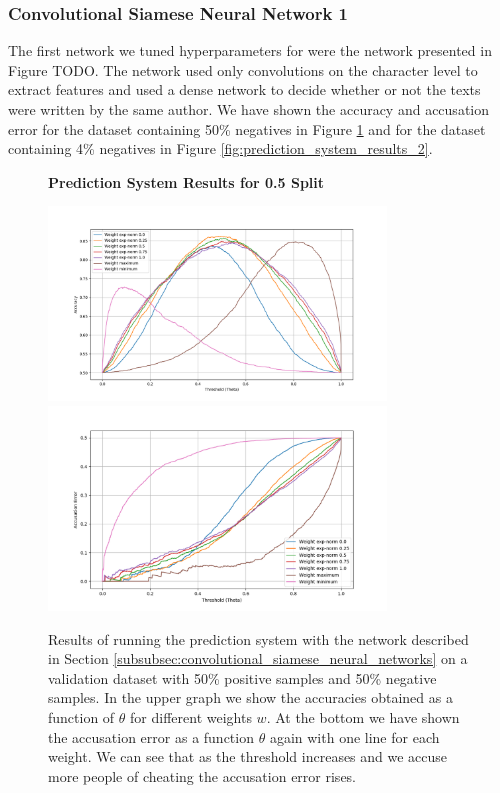 \subsubsection{Convolutional Siamese Neural Network 1}

The first network we tuned hyperparameters for were the network presented
in Figure TODO. The network used only convolutions on the character level
to extract features and used a dense network to decide whether or not
the texts were written by the same author. We have shown the accuracy
and accusation error for the dataset containing 50\% negatives in Figure
\ref{fig:prediction_system_results_1} and for the dataset containing 4\%
negatives in Figure \ref{fig:prediction_system_results_2}.

\begin{figure}
    \centering
    \textbf{Prediction System Results for 0.5 Split}\par\medskip
    \includegraphics[width=0.8\textwidth]{./pictures/experiments/network3_prediction_system_accuracies.png}
    \includegraphics[width=0.8\textwidth]{./pictures/experiments/network3_prediction_system_accusation_error.png}
    \caption{Results of running the prediction system with the network described
        in Section \ref{subsubsec:convolutional_siamese_neural_networks} on a
        validation dataset with 50\% positive samples and 50\% negative samples.
        In the upper graph we show the accuracies obtained as a function of
        $\theta$ for different weights $w$. At the bottom we have shown the
        accusation error as a function $\theta$ again with one line for each
        weight. We can see that as the threshold increases and we accuse more
        people of cheating the accusation error rises.}
    \label{fig:prediction_system_results_1}
\end{figure}

